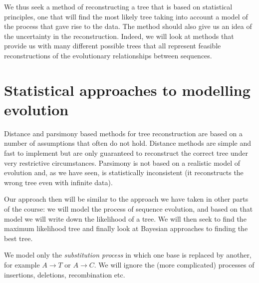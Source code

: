 \documentclass[11pt]{article}
\begin{document}
 We thus seek a method of reconstructing a tree that is based on statistical principles, one that will find the most likely tree taking into account a model of the process that gave rise to the data.   The method should also give us an idea of the uncertainty in the reconstruction.  Indeed, we will look at methods that provide us with many different possible trees that all represent feasible reconstructions of the evolutionary relationships between sequences.
 

 
% 
% 
%
 
  
\section{Statistical approaches to modelling evolution}
 
Distance and parsimony based methods for tree reconstruction are based on a number of assumptions that often do not hold.  Distance methods are simple and fast to implement but are  only guaranteed to reconstruct the correct tree under very restrictive circumstances.  Parsimony is not based on a realistic model of evolution and, as we have seen, is statistically inconsistent (it reconstructs the wrong tree even with infinite data).  

Our approach then will be similar to the approach we have taken in  other parts of the course: we will model the process of sequence evolution, and based on that model we will write down the likelihood of a tree.  We will then seek to find the maximum likelihood tree and finally look at Bayesian approaches to finding the best tree.

We model only the {\em substitution process} in which one base is replaced by another, for example $A \rightarrow T$ or $A \rightarrow C$.  We will ignore the (more complicated) processes of insertions, deletions, recombination etc.  
\end{document}
